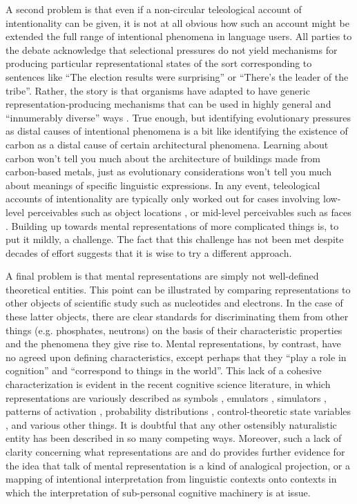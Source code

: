 A second problem is that even if a non-circular teleological account of intentionality can be given, it is not at all obvious how such an account might be extended the full range of intentional phenomena in language users. All parties to the debate acknowledge that selectional pressures do not yield mechanisms for producing particular representational states of the sort corresponding to sentences like ``The election results were surprising'' or ``There's the leader of the tribe''. Rather, the story is that organisms have adapted to have generic representation-producing mechanisms that can be used in highly general and ``innumerably diverse'' ways \citep[][p. 292]{Millikan:1989}. True enough, but identifying evolutionary pressures as distal causes of intentional phenomena is a bit like identifying the existence of carbon as a distal cause of certain architectural phenomena. Learning about carbon won't tell you much about the architecture of buildings made from carbon-based metals, just as evolutionary considerations won't tell you much about meanings of specific linguistic expressions. In any event, teleological accounts of intentionality are typically only worked out for cases involving low-level perceivables such as object locations \citep{Millikan:1989}, or mid-level perceivables such as faces \citep{Dennett:1987}. Building up towards mental representations of more complicated things is, to put it mildly, a challenge. The fact that this challenge has not been met despite decades of effort suggests that it is wise to try a different approach.

A final problem is that mental representations are simply not well-defined theoretical entities. This point can be illustrated by comparing representations to other objects of scientific study such as nucleotides and electrons. In the case of these latter objects, there are clear standards for discriminating them from other things (e.g. phosphates, neutrons) on the basis of their characteristic properties and the phenomena they give rise to. Mental representations, by contrast, have no agreed upon defining characteristics, except perhaps that they ``play a role in cognition'' and ``correspond to things in the world''. This lack of a cohesive characterization is evident in the recent cognitive science literature, in which representations are variously described as symbols \citep{Fodor:1998}, emulators \citep{Grush:2004}, simulators \citep{Barsalou:1999}, patterns of activation \citep{McClelland:2010}, probability distributions \citep{Goodman:2015} , control-theoretic state variables \citep{Eliasmith:2003,Eliasmith:2013}, and various other things. It is doubtful that any other ostensibly naturalistic entity has been described in so many competing ways. Moreover, such a lack of clarity concerning what representations are and do provides further evidence for the idea that talk of mental representation is a kind of analogical projection, or a mapping of intentional interpretation from linguistic contexts onto contexts in which the interpretation of sub-personal cognitive machinery is at issue.

